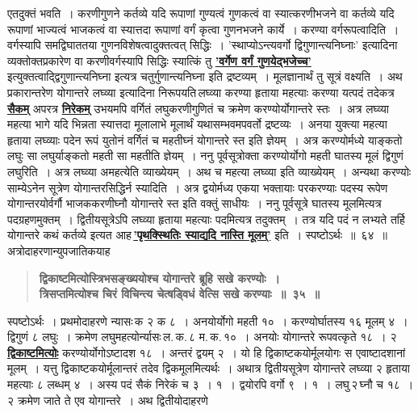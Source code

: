 \documentclass[11pt, openany]{book}
\begin{document}
\newpage

\begin{sloppypar}
\noindent एतदुक्तं भवति~। करणीगुणने कर्तव्ये यदि रूपाणां गुण्यत्वं गुणकत्वं वा स्यात्करणीभजने वा कर्तव्ये यदि रूपाणां भाज्यत्वं भाजकत्वं वा स्यात्तदा रूपाणां वर्गं कृत्वा गुणनभजने कार्ये~। करण्या वर्गरूपत्वादिति~। वर्गस्यापि समद्विघाततया गुणनविशेषत्वादुक्तत्वत् सिद्धिः~। {\color{violet}'स्थाप्योऽन्त्यवर्गो द्विगुणान्त्यनिघ्नाः'} इत्यादिना व्यक्तोक्तप्रकारेण वा करणीवर्गस्यापि सिद्धिः स्यात्किं तु \hyperref[4.34]{\textbf{'वर्गेण वर्गं गुणयेद्भजेच्च'}} इत्युक्तत्वाद्द्विगुणान्त्यनिघ्ना इत्यत्र चतुर्गुणान्त्यनिघ्ना इति द्रष्टव्यम्~। मूलज्ञानार्थं तु सूत्रं वक्ष्यति~। अथ प्रकारान्तरेण योगान्तरे लघ्व्या इत्यादिना निरूपयति\textendash \,लघ्व्या करण्या हृताया महत्याः करण्या यत्पदं तदेकत्र \hyperref[4.34]{\textbf{सैकम्}} अपरत्र \hyperref[4.34]{\textbf{निरेकम्}} उभयमपि वर्गितं लघुकरणीगुणितं च क्रमेण करण्योर्योगान्तरे स्तः~। अत्र लघ्व्या महत्या भागे यदि भिन्नता स्यात्तदा मूलालाभे मूलार्थं यथासम्भवमपवर्तो द्रष्टव्यः~। अनया युक्त्या महत्या हृताया लघ्व्याः पदेन रूपं युतोनं वर्गितं च महतीघ्नं योगान्तरे स्त इति ज्ञेयम्~। अत्र करण्योर्मध्ये याङ्कतो लघुः सा लघुर्याङ्कतो महती सा महतीति ज्ञेयम्~। ननु पूर्वसूत्रोक्ता करण्योर्योगो महती घातस्य मूलं द्विगुणं लघुरिति~। अत्र लघ्व्या अमहत्येति व्याख्येयम्~। अथ च महत्या लघ्व्या इति व्याख्येयम्~। अन्यथा करण्योः साम्येऽनेन सूत्रेण योगान्तरसिद्धिर्न स्यादिति~। अत्र द्वयोर्मध्य एकया भक्तायाः परकरण्याः पदस्य रूपेण योगान्तरयोर्वर्गौ भाजककरणीघ्नौ योगान्तरे स्त इति वक्तुं साधीयः~। ननु पूर्वसूत्रे घातस्य मूलमित्यत्र पदग्रहणमुक्तम्~। द्वितीयसूत्रेऽपि लघ्व्या हृताया महत्याः पदमित्यत्र तदुक्तम्~। तत्र यदि पदं न लभ्यते तर्हि योगान्तरे कथं कर्तव्ये इत्यत आह\textendash \,\hyperref[4.34]{\textbf{'पृथक्स्थितिः स्याद्यदि नास्ति मूलम्'}} इति~। स्पष्टोऽर्थः~॥~६४~॥ \\

{\small अत्रोदाहरणान्युपजातिकयाह\textendash }

 \label{4.35}
\begin{quote}
{\large \textbf{{\color{purple}द्विकाष्टमित्योस्त्रिभसङ्ख्ययोश्च योगान्तरे ब्रूहि सखे करण्योः~।\\
त्रिसप्तमित्योश्च चिरं विचिन्त्य चेत्षड्विधं वेत्सि सखे करण्याः~॥~३५~॥}}}
\end{quote}

स्पष्टोऽर्थः~। प्रथमोदाहरणे न्यासः\textendash \,क २ क ८~। अनयोर्योगो महती १०~। करण्योर्घातस्य १६ मूलम् ४~। द्विगुणं ८ लघुः~। क्रमेण लघुमहत्योर्न्यासः\textendash \,ल.\,क.\,८ म.\,क.\,१०~। अनयोः योगान्तरे रूपवत्कृते १८~। २ \hyperref[4.35]{\textbf{द्विकाष्टमित्योः}} करण्योर्योगोऽष्टादश १८~। अन्तरं द्वयम् २~। यो हि द्विकाष्टकयोर्मूलयोगः स एवाष्टादशानां मूलम्~। यत्तु द्विकाष्टकयोर्मूलान्तरं तदेव द्विकमूलमित्यर्थः~। अथात्र द्वितीयसूत्रेण योगान्तरे लघ्व्या २ हृताया महत्याः ८ लब्धम् ४~। अस्य पदं सैकं निरेकं च ३~। १~। द्वयोरपि वर्गो ९~। १~। लघु\textendash \,२\textendash \,घ्नौ च १८~। २ क्रमेण जाते ते एव योगान्तरे~। अथ द्वितीयोदाहरणे
\end{sloppypar}
\end{document}
